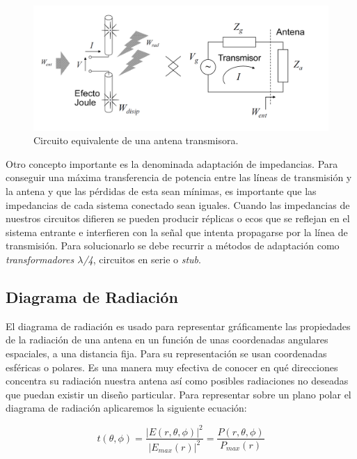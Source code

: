 \begin{figure}[h]
    \centering
        \includegraphics[width=15cm]{archivos/impedancia}
        \caption{Circuito equivalente de una antena transmisora. \cite{Cardama2002}}
        \label{fig:impedancia}
\end{figure}
\par Otro concepto importante es la denominada adaptación de impedancias. Para conseguir una máxima transferencia de potencia entre las líneas de transmisión y la antena y que las pérdidas de esta sean mínimas, es importante que las impedancias de cada sistema conectado sean iguales. Cuando las impedancias de nuestros circuitos difieren se pueden producir réplicas o ecos que se reflejan en el sistema entrante e interfieren con la señal que intenta propagarse por la línea de transmisión. Para solucionarlo se debe recurrir a métodos de adaptación como \textit{transformadores $\lambda$/4}, circuitos en serie o \textit{stub}.

\subsection{Diagrama de Radiación}

\par El diagrama de radiación es usado para representar gráficamente las propiedades de la radiación de una antena en un función de unas coordenadas angulares espaciales, a una distancia fija. Para su representación se usan coordenadas esféricas o polares. Es una manera muy efectiva de conocer en qué direcciones concentra su radiación nuestra antena así como posibles radiaciones no deseadas que puedan existir un diseño particular. Para representar sobre un plano polar el diagrama de radiación aplicaremos la siguiente ecuación:

\begin{equation}
	t(\theta, \phi )=\frac{\left | E(r, \theta, \phi ) \right |^2}{\left | E_{max}(r) \right |^2}= \frac{P(r,\theta ,\phi)}{P_{max}(r)}
	\label{eq:diagramarad}
\end{equation}

